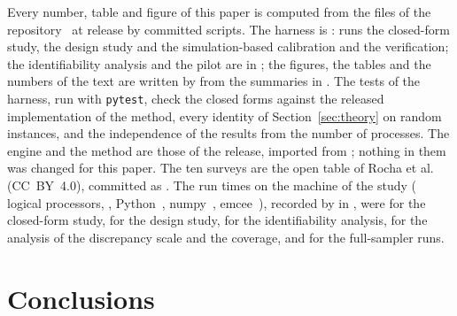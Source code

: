 Every number, table and figure of this paper is computed from the files of the repository~\cite{chancadem} at release
\productrelease{} by committed scripts. The harness is :  runs
the closed-form study,  the design study and  the simulation-based calibration and the
verification; the identifiability analysis and the pilot are in ; the
figures, the tables and the numbers of the text are written by 
from the summaries in . The tests of the harness, run with \texttt{pytest},
check the closed forms against the released implementation of the method, every identity of Section~\ref{sec:theory} on random
instances, and the independence of the results from the number of processes. The engine and the method are those of the
release, imported from ; nothing in them was changed for this paper. The ten surveys are the
open table of Rocha et al.~\cite{rocha} (CC~BY~4.0), committed as . The run times on the
machine of the study (\envCpus{} logical processors, \envPlatform, Python~\envPython, numpy~\envNumpy, emcee~\envEmcee), recorded
by  in , were \runExactTime{} for the closed-form study,
\runDesignTime{} for the design study, \runIdentTime{} for the identifiability analysis, \runTauTime{} for the analysis of the
discrepancy scale and the coverage, and \runSamplerTime{} for the full-sampler runs.

\section{Conclusions}\label{sec:conclusions}

